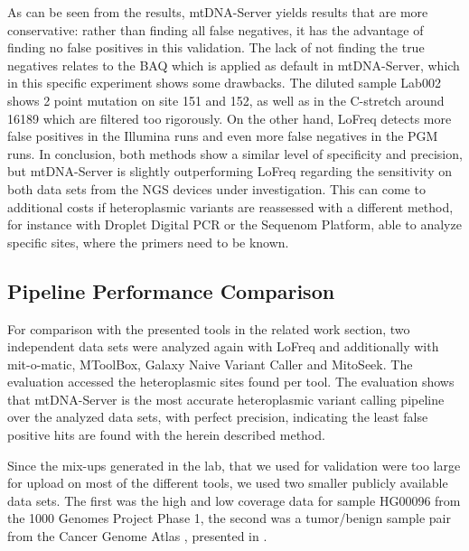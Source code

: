 As can be seen from the results, mtDNA-Server yields results that are more conservative: rather than finding all false negatives, it has the advantage of finding no false positives in this validation. The lack of not finding the true negatives relates to the BAQ which is applied as default in mtDNA-Server, which in this specific experiment shows some drawbacks. The diluted sample Lab002 shows 2 point mutation on site 151 and 152, as well as in the C-stretch around 16189 which are filtered too rigorously. On the other hand, LoFreq detects more false positives in the Illumina runs and even more false negatives in the PGM runs. In conclusion, both methods show a similar level of specificity and precision, but mtDNA-Server is slightly outperforming LoFreq regarding the sensitivity on both data sets from the NGS devices under investigation. This can come to additional costs if heteroplasmic variants are reassessed with a different method, for instance with Droplet Digital PCR or the Sequenom Platform, able to analyze specific sites, where the primers need to be known. 
\subsection{Pipeline Performance Comparison }
For comparison with the presented tools in the related work section, two independent data sets were analyzed again with LoFreq and additionally with mit-o-matic, MToolBox, Galaxy Naive Variant Caller and  MitoSeek. The evaluation accessed the heteroplasmic sites found per tool. The evaluation shows that mtDNA-Server is the most accurate heteroplasmic variant calling pipeline over the analyzed data sets, with perfect precision, indicating the least false positive hits are found with the herein described method.

Since the mix-ups generated in the lab, that we used for validation were too large for upload on most of the different tools, we used two smaller publicly available data sets. The first was the high and low coverage data for sample HG00096 from the 1000 Genomes Project Phase 1, the second was a tumor/benign sample pair from the Cancer Genome Atlas \cite{Chang2013}, presented in \cite{Guo2013}.

